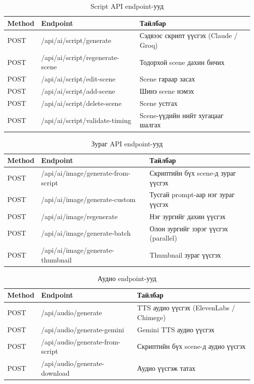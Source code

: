 \begin{table}[H]
\centering
\label{tab:script_api}
\begin{tabular}{|l|p{5.5cm}|p{5cm}|}
\hline
\textbf{Method} & \textbf{Endpoint} & \textbf{Тайлбар} \\
\hline
POST & /api/ai/script/generate & Сэдвээс скрипт үүсгэх (Claude / Groq) \\
\hline
POST & /api/ai/script/regenerate-scene & Тодорхой scene дахин бичих \\
\hline
POST & /api/ai/script/edit-scene & Scene гараар засах \\
\hline
POST & /api/ai/script/add-scene & Шинэ scene нэмэх \\
\hline
POST & /api/ai/script/delete-scene & Scene устгах \\
\hline
POST & /api/ai/script/validate-timing & Scene-үүдийн нийт хугацааг шалгах \\
\hline
\end{tabular}
\caption{Script API endpoint-ууд}
\end{table}

\begin{table}[H]
\centering
\label{tab:image_api}
\begin{tabular}{|l|p{5.5cm}|p{5cm}|}
\hline
\textbf{Method} & \textbf{Endpoint} & \textbf{Тайлбар} \\
\hline
POST & /api/ai/image/generate-from-script & Скриптийн бүх scene-д зураг үүсгэх \\
\hline
POST & /api/ai/image/generate-custom & Тусгай prompt-аар нэг зураг үүсгэх \\
\hline
POST & /api/ai/image/regenerate & Нэг зургийг дахин үүсгэх \\
\hline
POST & /api/ai/image/generate-batch & Олон зургийг зэрэг үүсгэх (parallel) \\
\hline
POST & /api/ai/image/generate-thumbnail & Thumbnail зураг үүсгэх \\
\hline
\end{tabular}
\caption{Зураг API endpoint-ууд}
\end{table}

\begin{table}[H]
\centering
\label{tab:audio_api}
\begin{tabular}{|l|p{5.5cm}|p{5cm}|}
\hline
\textbf{Method} & \textbf{Endpoint} & \textbf{Тайлбар} \\
\hline
POST & /api/audio/generate & TTS аудио үүсгэх (ElevenLabs / Chimege) \\
\hline
POST & /api/audio/generate-gemini & Gemini TTS аудио үүсгэх \\
\hline
POST & /api/audio/generate-from-script & Скриптийн бүх scene-д аудио үүсгэх \\
\hline
POST & /api/audio/generate-download & Аудио үүсгэж татах \\
\hline
\end{tabular}
\caption{Аудио endpoint-ууд}
\end{table}

